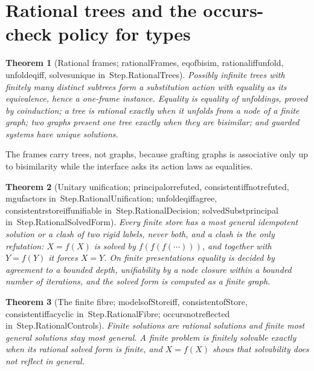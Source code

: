 \documentclass[11pt]{article}
\newtheorem{theorem}{Theorem}
\theoremstyle{remark}
\newcommand{\lean}[1]{{\ttfamily\def\_{\textunderscore\allowbreak}#1}}
\newcommand{\inmod}[1]{in~{\ttfamily\def\_{\textunderscore\allowbreak}#1}}
\begin{document}
\section{Rational trees and the occurs-check policy for types}\label{sec:rational}

\begin{theorem}[Rational frames; \lean{rationalFrames}, \lean{eq\_of\_bisim}, \lean{rational\_iff\_unfold}, \lean{unfold\_eq\_iff}, \lean{solves\_unique} \inmod{Step.RationalTrees}]
Possibly infinite trees with finitely many distinct subtrees form a substitution action with equality as
its equivalence, hence a one-frame instance. Equality is equality of unfoldings, proved by coinduction;
a tree is rational exactly when it unfolds from a node of a finite graph; two graphs present one tree
exactly when they are bisimilar; and guarded systems have unique solutions.
\end{theorem}
The frames carry trees, not graphs, because grafting graphs is associative only up to bisimilarity while
the interface asks its action laws as equalities.

\begin{theorem}[Unitary unification; \lean{principal\_or\_refuted}, \lean{consistent\_iff\_not\_refuted}, \lean{mgu\_factors} \inmod{Step.RationalUnification}; \lean{unfold\_eq\_iff\_agree}, \lean{consistent\_rstore\_iff\_unifiable} \inmod{Step.RationalDecision}; \lean{solvedSubst\_principal} \inmod{Step.RationalSolvedForm}]
Every finite store has a most general idempotent solution or a clash of two rigid labels, never both,
and a clash is the only refutation: $X = f(X)$ is solved by $f(f(f(\cdots)))$, and together with $Y = f(Y)$
it forces $X = Y$. On finite presentations equality is decided by agreement to a bounded depth,
unifiability by a node closure within a bounded number of iterations, and the solved form is computed as
a finite graph.
\end{theorem}

\begin{theorem}[The finite fibre; \lean{models\_ofStore\_iff}, \lean{consistent\_ofStore}, \lean{consistent\_iff\_acyclic} \inmod{Step.RationalFibre}; \lean{occurs\_not\_reflected} \inmod{Step.RationalControls}]
Finite solutions are rational solutions and finite most general solutions stay most general. A finite
problem is finitely solvable exactly when its rational solved form is finite, and $X = f(X)$ shows that
solvability does not reflect in general.
\end{theorem}
\end{document}
